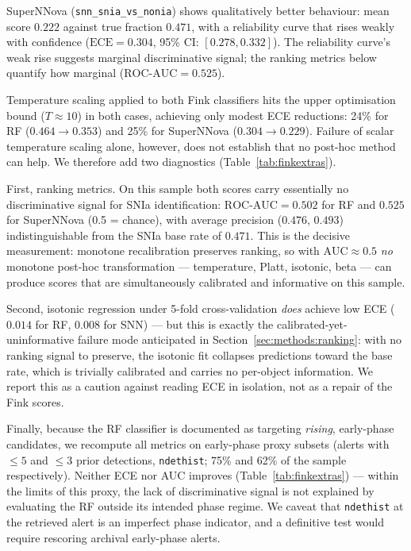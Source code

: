 SuperNNova (\texttt{snn\_snia\_vs\_nonia}) shows qualitatively 
better behaviour: mean score $0.222$ against true fraction $0.471$, 
with a reliability curve that rises weakly with confidence 
($\mathrm{ECE} = 0.304$, 95\% CI: $[0.278, 0.332]$). The
reliability curve's weak rise suggests marginal discriminative
signal; the ranking metrics below quantify how marginal
($\mathrm{ROC\mbox{-}AUC} = 0.525$).

Temperature scaling applied to both Fink classifiers hits the
upper optimisation bound ($T \approx 10$) in both cases,
achieving only modest ECE reductions: 24\% for RF
($0.464 \to 0.353$) and 25\% for SuperNNova
($0.304 \to 0.229$). Failure of scalar temperature scaling alone,
however, does not establish that no post-hoc method can help. We
therefore add two diagnostics (Table~\ref{tab:finkextras}).

First, ranking metrics. On this sample both scores carry essentially
no discriminative signal for SNIa identification:
$\mathrm{ROC\mbox{-}AUC} = 0.502$ for RF and $0.525$ for SuperNNova
(0.5 = chance), with average precision ($0.476$, $0.493$)
indistinguishable from the SNIa base rate of $0.471$. This is the
decisive measurement: monotone recalibration preserves ranking, so
with $\mathrm{AUC} \approx 0.5$ \emph{no} monotone post-hoc
transformation — temperature, Platt, isotonic, beta — can produce
scores that are simultaneously calibrated and informative on this
sample.

Second, isotonic regression under 5-fold cross-validation
\emph{does} achieve low ECE ($0.014$ for RF, $0.008$ for SNN) — but
this is exactly the calibrated-yet-uninformative failure mode
anticipated in Section~\ref{sec:methods:ranking}: with no ranking
signal to preserve, the isotonic fit collapses predictions toward
the base rate, which is trivially calibrated and carries no
per-object information. We report this as a caution against reading
ECE in isolation, not as a repair of the Fink scores.

Finally, because the RF classifier is documented as targeting
\textit{rising}, early-phase candidates, we recompute all metrics on
early-phase proxy subsets (alerts with $\leq 5$ and $\leq 3$ prior
detections, \texttt{ndethist}; 75\% and 62\% of the sample
respectively). Neither ECE nor AUC improves
(Table~\ref{tab:finkextras}) — within the limits of this proxy, the
lack of discriminative signal is not explained by evaluating the RF
outside its intended phase regime. We caveat that \texttt{ndethist}
at the retrieved alert is an imperfect phase indicator, and a
definitive test would require rescoring archival early-phase alerts.

